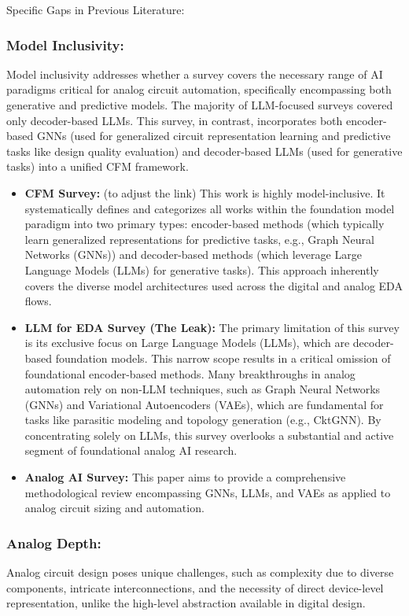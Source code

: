 \documentclass{ieeeaccess}
\begin{document}
Specific Gaps in Previous Literature:

\subsubsection{Model Inclusivity:} Model inclusivity addresses whether a survey covers the necessary range of AI
paradigms critical for analog circuit automation, specifically encompassing
both generative and predictive models. The majority of LLM-focused surveys
covered only decoder-based LLMs. This survey, in contrast, incorporates both
encoder-based GNNs (used for generalized circuit representation learning and
predictive tasks like design quality evaluation) and decoder-based LLMs (used
for generative tasks) into a unified CFM framework.

\begin{itemize}
	\item \textbf{CFM Survey:} (to adjust the link) This work is highly model-inclusive. It systematically defines and categorizes all works within the foundation model paradigm into two primary types: encoder-based methods (which typically learn generalized representations for predictive tasks, e.g., Graph Neural Networks (GNNs)) and decoder-based methods (which leverage Large Language Models (LLMs) for generative tasks). This approach inherently covers the diverse model architectures used across the digital and analog EDA flows.

	\item \textbf{LLM for EDA Survey (The Leak):} The primary limitation of this survey is its exclusive focus on Large Language Models (LLMs), which are decoder-based foundation models. This narrow scope results in a critical omission of foundational encoder-based methods. Many breakthroughs in analog automation rely on non-LLM techniques, such as Graph Neural Networks (GNNs) and Variational Autoencoders (VAEs), which are fundamental for tasks like parasitic modeling and topology generation (e.g., CktGNN). By concentrating solely on LLMs, this survey overlooks a substantial and active segment of foundational analog AI research.

	\item \textbf{Analog AI Survey:} This paper aims to provide a comprehensive methodological review encompassing GNNs, LLMs, and VAEs as applied to analog circuit sizing and automation.
\end{itemize}

\subsubsection{Analog Depth:} Analog circuit design poses unique challenges, such as complexity due to
diverse components, intricate interconnections, and the necessity of direct
device-level representation, unlike the high-level abstraction available in
digital design.
\end{document}
